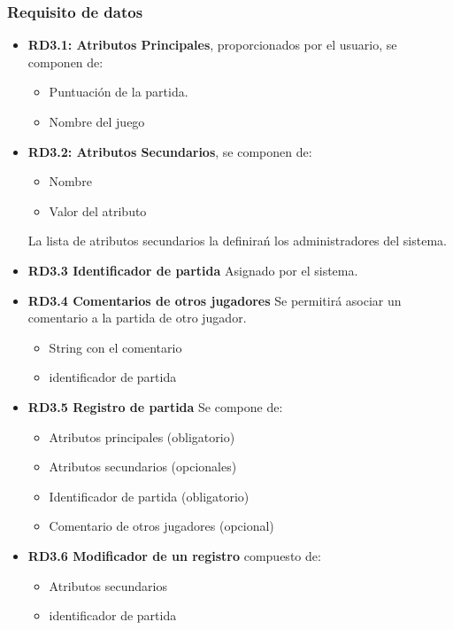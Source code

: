 \subsubsection{Requisito de datos}

\begin{itemize}
	\item \textbf{RD3.1: Atributos Principales}, proporcionados por el usuario, se componen de:
	\begin{itemize}
		\item Puntuación de la partida.
		\item Nombre del juego
	\end{itemize}

	\item \textbf{RD3.2: Atributos Secundarios}, se componen de:
	\begin{itemize}
		\item Nombre
		\item Valor del atributo
	\end{itemize}
	La lista de atributos secundarios la definirań los administradores del sistema.

	\item \textbf{RD3.3 Identificador de partida} Asignado por el sistema.

	\item \textbf{RD3.4 Comentarios de otros jugadores} Se permitirá asociar un comentario a la partida de otro jugador.
	\begin{itemize}
	\item String con el comentario
	\item identificador de partida
	\end{itemize}

	\item \textbf{RD3.5 Registro de partida} Se compone de:
	\begin{itemize}
		\item Atributos principales (obligatorio)
		\item Atributos secundarios (opcionales)
		\item Identificador de partida (obligatorio)
		\item Comentario de otros jugadores (opcional)
	\end{itemize}

	\item \textbf{RD3.6 Modificador de un registro} compuesto de:
	\begin{itemize}
	\item Atributos secundarios
	\item identificador de partida
	\end{itemize}


\end{itemize}



